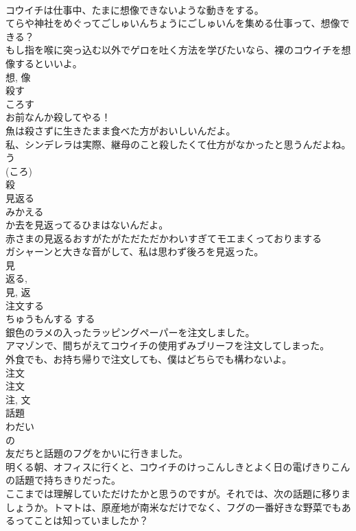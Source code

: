 \documentclass[8pt]{extreport}
\begin{document}
\begin{CJK}{UTF8}{min}
\\	コウイチは仕事中、たまに想像できないような動きをする。	
\\	てらや神社をめぐってごしゅいんちょうにごしゅいんを集める仕事って、想像できる？	
\\	もし指を喉に突っ込む以外でゲロを吐く方法を学びたいなら、裸のコウイチを想像するといいよ。	
\\	想, 像	
\\	殺す	
\\	ころす	
\\	お前なんか殺してやる！	
\\	魚は殺さずに生きたまま食べた方がおいしいんだよ。	
\\	私、シンデレラは実際、継母のこと殺したくて仕方がなかったと思うんだよね。	
\\	う 
\\	(ころ) 
\\	殺	
\\	見返る	
\\	みかえる	
\\	か去を見返ってるひまはないんだよ。	
\\	赤さまの見返るおすがたがただただかわいすぎてモエまくっておりまする
\\	ガシャーンと大きな音がして、私は思わず後ろを見返った。	
\\	見 
\\	返る, 
\\	見, 返	
\\	注文する	
\\	ちゅうもんする	する 
\\	銀色のラメの入ったラッピングペーパーを注文しました。	
\\	アマゾンで、間ちがえてコウイチの使用ずみブリーフを注文してしまった。	
\\	外食でも、お持ち帰りで注文しても、僕はどちらでも構わないよ。	
\\	注文 
\\	注文 
\\	注, 文	
\\	話題	
\\	わだい	
\\	の 
\\	友だちと話題のフグをかいに行きました。	
\\	明くる朝、オフィスに行くと、コウイチのけっこんしきとよく日の電げきりこんの話題で持ちきりだった。	
\\	ここまでは理解していただけたかと思うのですが。それでは、次の話題に移りましょうか。トマトは、原産地が南米なだけでなく、フグの一番好きな野菜でもあるってことは知っていましたか？	

\end{CJK}
\end{document}
